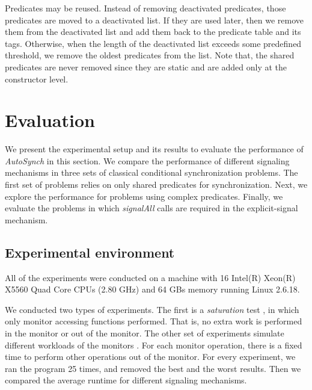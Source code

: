 \documentclass{sigplanconf}
\begin{document}
Predicates may be reused. Instead of removing deactivated predicates, 
those predicates are moved to a deactivated list. If they are used later, then 
we remove them from the deactivated list and add them back to the predicate
table and its tags. 
Otherwise, when the length of the deactivated list exceeds some 
predefined threshold, we remove the oldest predicates from the list. Note that, 
the shared predicates are never removed since they are static and are added 
only at the constructor level. 


\section{Evaluation} \label{sec:eval}

We present the experimental setup and its results to evaluate the 
performance of {\em AutoSynch} in this section. 
We compare the performance of different signaling
mechanisms in three sets of classical conditional synchronization problems. 
The first set of problems relies on only shared predicates for synchronization. 
Next, we explore the performance for problems using complex predicates. 
Finally, we evaluate the problems in which {\em signalAll} calls are required 
in the explicit-signal mechanism. 

\subsection{Experimental environment}
All of the experiments were conducted on a machine with 16 Intel(R) Xeon(R) 
X5560 Quad Core CPUs (2.80 GHz) and 64 GBs memory running Linux 2.6.18. 

We conducted two types of experiments. The first is a {\em saturation} test 
\cite{bh05}, in which only monitor accessing functions performed. That is, no 
extra work is performed in the monitor or out of the monitor. The other set of
experiments simulate different workloads of the monitors \cite{bfc95}. For each
monitor operation, there is a fixed time to perform other operations out of the
monitor. 
For every experiment, we ran the program 25  
times, and removed the best and the worst results. Then we compared 
the average runtime for different signaling mechanisms. 
\end{document}
